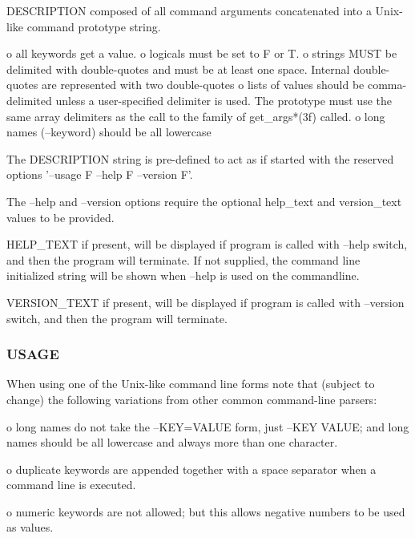 \begin{DoxyVerb}  DESCRIPTION   composed of all command arguments concatenated
                into a Unix-like command prototype string.

                o all keywords get a value.
                o logicals must be set to F or T.
                o strings MUST be delimited with double-quotes and
                  must be at least one space. Internal double-quotes
                  are represented with two double-quotes
                o lists of values should be comma-delimited unless a
                  user-specified delimiter is used. The prototype
                  must use the same array delimiters as the call to
                  the family of get_args*(3f) called.
                o long names (--keyword) should be all lowercase

                The DESCRIPTION string is pre-defined to act as if
                started with the reserved options '--usage F --help
                F --version F'.

                The --help and --version options require the optional
                help_text and version_text values to be provided.

  HELP_TEXT     if present, will be displayed if program is called with
                --help switch, and then the program will terminate. If
                not supplied, the command line initialized string will be
                shown when --help is used on the commandline.

  VERSION_TEXT  if present, will be displayed if program is called with
                --version switch, and then the program will terminate.
\end{DoxyVerb}


\subsubsection*{U\+S\+A\+GE}

When using one of the Unix-\/like command line forms note that (subject to change) the following variations from other common command-\/line parsers\+:

o long names do not take the --K\+EY=V\+A\+L\+UE form, just --K\+EY V\+A\+L\+UE; and long names should be all lowercase and always more than one character.

o duplicate keywords are appended together with a space separator when a command line is executed.

o numeric keywords are not allowed; but this allows negative numbers to be used as values.

